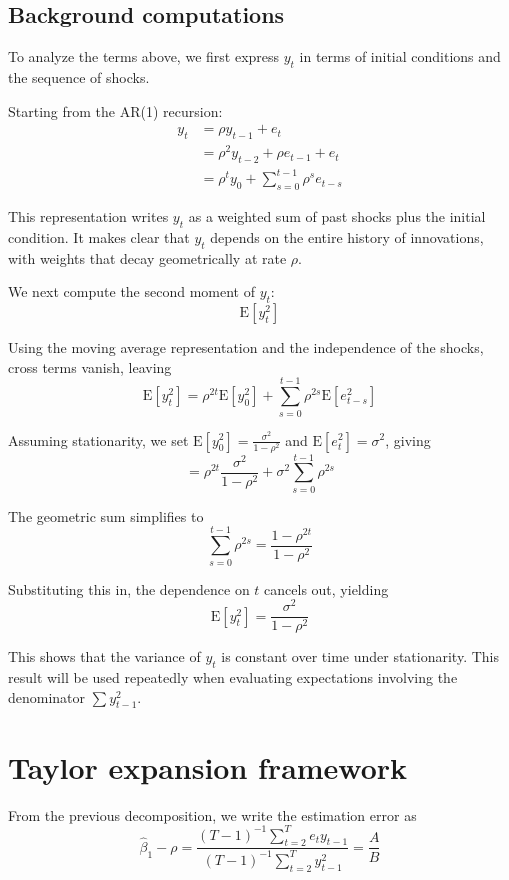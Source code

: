 \documentclass[11pt]{article}
\begin{document}
\subsection{Background computations}\label{background-computations}

To analyze the terms above, we first express \(y_t\) in terms of initial
conditions and the sequence of shocks.

Starting from the AR(1) recursion: \[
\begin{aligned}
y_t&=\rho y_{t-1}+e_t\\
&=\rho^2 y_{t-2}+\rho e_{t-1}+e_t\\
&=\rho^t y_{0}+\sum_{s=0}^{t-1}\rho^s e_{t-s}
\end{aligned}
\]

This representation writes \(y_t\) as a weighted sum of past shocks plus
the initial condition. It makes clear that \(y_t\) depends on the entire
history of innovations, with weights that decay geometrically at rate
\(\rho\).

We next compute the second moment of \(y_t\): \[
\text{E}\left[y_{t}^2\right]
\]

Using the moving average representation and the independence of the
shocks, cross terms vanish, leaving \[
\text{E}\left[y_{t}^2\right]
=\rho^{2t} \text{E}\left[y_0^2\right]+\sum_{s=0}^{t-1}\rho^{2s}\text{E}\left[e_{t-s}^2\right]
\]

Assuming stationarity, we set
\(\text{E}[y_0^2] = \frac{\sigma^2}{1-\rho^2}\) and
\(\text{E}[e_t^2] = \sigma^2\), giving \[
=\rho^{2t} \frac{\sigma^2}{1-\rho^2}+\sigma^2\sum_{s=0}^{t-1}\rho^{2s}
\]

The geometric sum simplifies to \[
\sum_{s=0}^{t-1}\rho^{2s} = \frac{1 - \rho^{2t}}{1 - \rho^2}
\]

Substituting this in, the dependence on \(t\) cancels out, yielding \[
\text{E}\left[y_t^2\right] = \frac{\sigma^2}{1-\rho^2}
\]

This shows that the variance of \(y_t\) is constant over time under
stationarity. This result will be used repeatedly when evaluating
expectations involving the denominator \(\sum y_{t-1}^2\).

    \section{Taylor expansion framework}\label{taylor-expansion-framework}

From the previous decomposition, we write the estimation error as \[
\hat\beta_{1}-\rho = \frac{(T-1)^{-1}\sum_{t=2}^{T} e_t y_{t-1}}{(T-1)^{-1}\sum_{t=2}^{T} y_{t-1}^2} = \frac{A}{B}
\]
\end{document}
